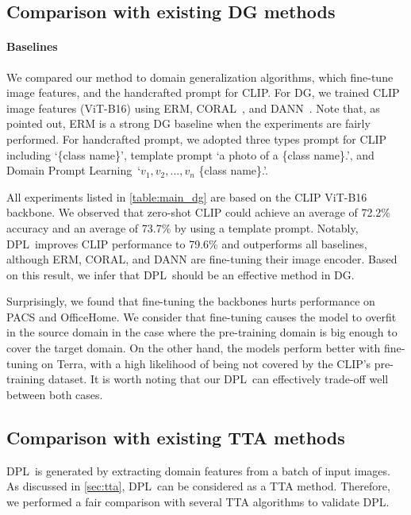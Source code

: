 \documentclass[letterpaper]{article} \usepackage[]{aaai23}
\newcommand{\dplshort}{DPL}
\newcommand{\dpllong}{Domain Prompt Learning}
\begin{document}
\subsection{Comparison with existing DG methods}
\label{subsec:dg}

\paragraph{Baselines}
We compared our method to domain generalization algorithms, which fine-tune image features, and the handcrafted prompt for CLIP.
For DG, we trained CLIP image features (ViT-B16) using ERM, CORAL~\cite{sun2016deep}, and DANN~\cite{ganin2016domain}. 
Note that, as~\cite{gulrajani2020search} pointed out, ERM is a strong DG baseline when the experiments are fairly performed. 
For handcrafted prompt, we adopted three types prompt for CLIP including `\{class name\}', template prompt `a photo of a \{class name\}.', and \dpllong~`$v_{1}, v_{2}, ..., v_{n}$ \{class name\}.'.

All experiments listed in \autoref{table:main_dg} are based on the CLIP ViT-B16 backbone.
We observed that zero-shot CLIP could achieve an average of 72.2\% accuracy and an average of 73.7\% by using a template prompt.
Notably, \dplshort~improves CLIP performance to 79.6\% and outperforms all baselines, although ERM, CORAL, and DANN are fine-tuning their image encoder.
Based on this result, we infer that \dplshort~should be an effective method in DG.

Surprisingly, we found that fine-tuning the backbones hurts performance on PACS and OfficeHome.
We consider that fine-tuning causes the model to overfit in the source domain in the case where the pre-training domain is big enough to cover the target domain.
On the other hand, the models perform better with fine-tuning on Terra, with a high likelihood of being not covered by the CLIP's pre-training dataset.
It is worth noting that our \dplshort~can effectively trade-off well between both cases.

\subsection{Comparison with existing TTA methods}

\dplshort~is generated by extracting domain features from a batch of input images.
As discussed in \autoref{sec:tta}, \dplshort~can be considered as a TTA method.
Therefore, we performed a fair comparison with several TTA algorithms to validate \dplshort.
\end{document}
